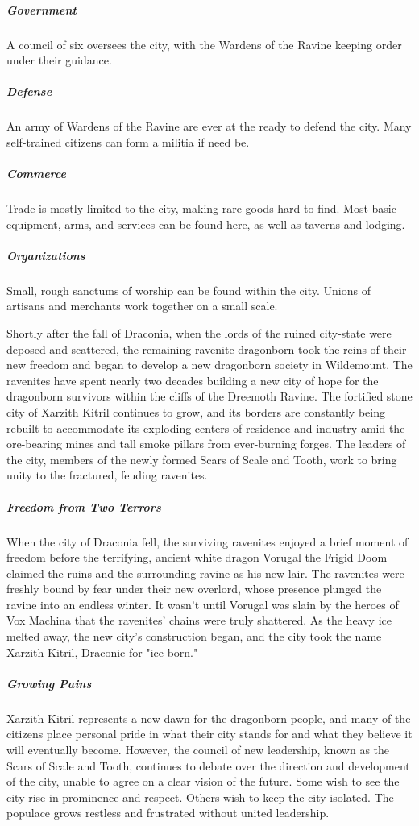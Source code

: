 \documentclass[10pt,a4paper,twoside,bg=print,twocolumn,openany,nodeprecatedcode]{dndbook}
\begin{document}
\subparagraph{Government}
A council of six oversees the city, with the Wardens of the Ravine keeping order under their guidance.

\subparagraph{Defense}
An army of Wardens of the Ravine are ever at the ready to defend the city. Many self-trained citizens can form a militia if need be.

\subparagraph{Commerce}
Trade is mostly limited to the city, making rare goods hard to find. Most basic equipment, arms, and services can be found here, as well as taverns and lodging.

\subparagraph{Organizations}
Small, rough sanctums of worship can be found within the city. Unions of artisans and merchants work together on a small scale.

Shortly after the fall of Draconia, when the lords of the ruined city-state were deposed and scattered, the remaining ravenite dragonborn took the reins of their new freedom and began to develop a new dragonborn society in Wildemount. The ravenites have spent nearly two decades building a new city of hope for the dragonborn survivors within the cliffs of the Dreemoth Ravine. The fortified stone city of Xarzith Kitril continues to grow, and its borders are constantly being rebuilt to accommodate its exploding centers of residence and industry amid the ore-bearing mines and tall smoke pillars from ever-burning forges. The leaders of the city, members of the newly formed Scars of Scale and Tooth, work to bring unity to the fractured, feuding ravenites.

\subparagraph{Freedom from Two Terrors}
When the city of Draconia fell, the surviving ravenites enjoyed a brief moment of freedom before the terrifying, ancient white dragon Vorugal the Frigid Doom claimed the ruins and the surrounding ravine as his new lair. The ravenites were freshly bound by fear under their new overlord, whose presence plunged the ravine into an endless winter. It wasn't until Vorugal was slain by the heroes of Vox Machina that the ravenites' chains were truly shattered. As the heavy ice melted away, the new city's construction began, and the city took the name Xarzith Kitril, Draconic for "ice born."

\subparagraph{Growing Pains}
Xarzith Kitril represents a new dawn for the dragonborn people, and many of the citizens place personal pride in what their city stands for and what they believe it will eventually become. However, the council of new leadership, known as the Scars of Scale and Tooth, continues to debate over the direction and development of the city, unable to agree on a clear vision of the future. Some wish to see the city rise in prominence and respect. Others wish to keep the city isolated. The populace grows restless and frustrated without united leadership.
\end{document}
